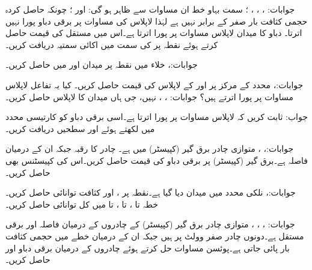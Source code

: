 جوابات: ، ،
 ، ؛ سمت بہاو خط ان مساوات سے ظاہر ہو گی:  اور ؛ چونکہ حاصل کردہ حجمی کثافت بار صفر کے برابر نہیں ہے لہٰذا لاپلاس کی مساوات پر برقی دباو پورا نہیں اترتا۔
دباو کا میدان  لاپلاس مساوات پر پورا اترتا ہے۔اس میں مستقل  کی قیمت حاصل کرتے ہوئے نقطہ  پر  کی سمت میں اکائی سمتیہ دریافت کریں۔

جوابات:، 
خلاء میں نقطہ  پر میدان  اور  میں  حاصل کریں۔

جوابات:، 
محدد کے مرکز  پر   اور  کے لاپلاس کی قیمت حاصل کریں۔ کیا یہ تفاعل لاپلاس مساوات پر پورا اترتے ہیں؟
جوابات: ، ، نہیں، جی ہاں
میدان  کا لاپلاس حاصل کریں۔

جواب: 
ثابت کریں کہ  لاپلاس مساوات پر پورا اترتا ہے۔اسی برقی دباو کو کارتیسی محدد میں لکھتے ہوئے  اور  سطحیں دریافت کریں۔

جوابات:، ، 
متوازی چادر برق گیر (کپیسٹر)  میں  ہے۔ چادر کا رقبہ  جبکہ ان کے درمیان فاصلہ  ہے۔برق گیر (کپیسٹر)  پر برقی دباو کی قیمت حاصل کریں۔اس کی کپیسٹنس بھی حاصل کریں۔

جوابات:، 
نلکی محدد میں میدان  دیا گیا ہے۔نقطہ  پر ،  اور کثافت توانائی حاصل کریں۔خطہ  تا ،  تا ،   تا  میں کل توانائی حاصل کریں۔

جوابات: ، ، ،
متوازی چادر برق گیر (کپیسٹر)  کے چادروں کے درمیان فاصلہ  اور برقی مستقل  ہے۔دونوں چادر صفر وولٹ پر ہیں جبکہ ان کے درمیان خطے  میں حجمی کثافت بار  پائی جاتی ہے۔پوئسن  مساوات حل کرتے ہوئے چادروں کے درمیان برقی دباو اور  حاصل کریں۔

